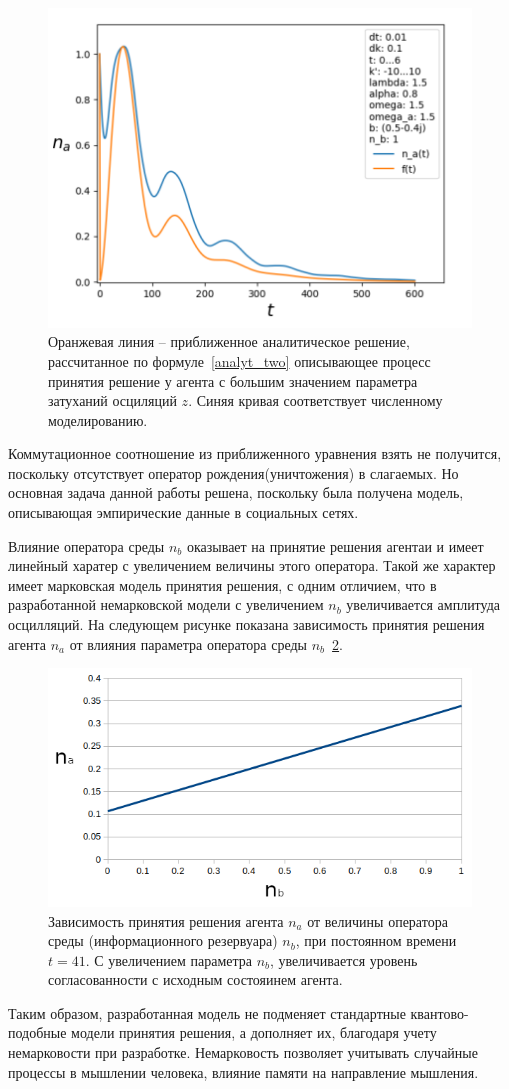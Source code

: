 \begin{figure}[h!]
    \centering
    \captionsetup{justification=centering}
    \includegraphics[width=0.7\linewidth]{pictures/result_second_6.png}
    \caption{Оранжевая линия – приближенное аналитическое решение, рассчитанное по формуле~\eqref{analyt_two}
    описывающее процесс принятия решение у агента с большим значением параметра затуханий осциляций $z$.
    Синяя кривая соответствует численному моделированию.}
    \label{fig:sr_proba_2}
\end{figure}

Коммутационное соотношение из приближенного уравнения взять не получится, поскольку отсутствует
оператор рождения(уничтожения) в слагаемых.
Но основная задача данной работы решена, поскольку была получена модель, описывающая эмпирические
данные в социальных сетях.

Влияние оператора среды $n_{b}$ оказывает на принятие решения агентаи и имеет линейный харатер с
увеличением величины этого оператора.
Такой же характер имеет марковская модель принятия решения, с одним отличием, что в разработанной
немарковской модели с увеличением $n_{b}$ увеличивается амплитуда осцилляций.
На следующем рисунке показана зависимость принятия решения агента $n_{a}$ от влияния параметра
оператора среды $n_{b}$~\ref{fig:na_nb}.
\newpage
\begin{figure}[h!]
    \centering
    \captionsetup{justification=centering}
    \includegraphics[width=0.7\linewidth]{pictures/na_nb.png}
    \caption{Зависимость принятия решения агента $n_{a}$ от величины оператора среды (информационного резервуара)
    $n_{b}$, при постоянном времени $t = 41$. С увеличением параметра $n_{b}$, увеличивается уровень
    согласованности с исходным состояинем агента.}
    \label{fig:na_nb}
\end{figure}
Таким образом, разработанная модель не подменяет стандартные квантово-подобные модели принятия решения,
а дополняет их, благодаря учету немарковости при разработке.
Немарковость позволяет учитывать случайные процессы в мышлении человека, влияние памяти на направление мышления.


